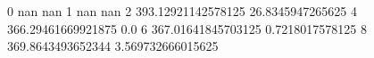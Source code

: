 0 nan nan
1 nan nan
2 393.12921142578125 26.8345947265625
4 366.29461669921875 0.0
6 367.01641845703125 0.7218017578125
8 369.8643493652344 3.569732666015625
